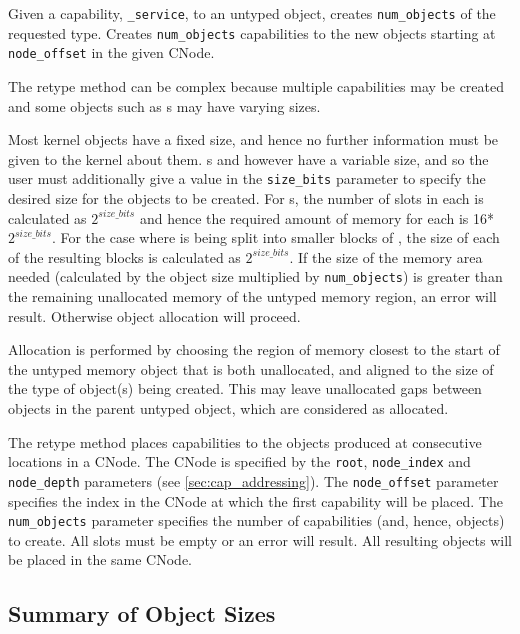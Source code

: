 {
Given a capability, \texttt{\_service}, to an untyped object,  
creates \texttt{num\_objects} of the requested type. Creates 
\texttt{num\_objects} capabilities to the new objects starting 
at \texttt{node\_offset} in the given CNode.

The retype method can be
complex because multiple capabilities may be created and some objects such as
s may have varying sizes.

Most kernel objects have a fixed size, and hence no further information
must be given to the kernel about them. s and  however have a variable size, and so the user must additionally
give a value in the \texttt{size\_bits} parameter to specify the desired
size for the objects to be created.
For s, the number of slots in each  is calculated as
$2^{size\_bits}$ and hence the required amount of memory for each is
16*$2^{size\_bits}$. For the case where  is being split into
smaller blocks of ,
the size of each of the resulting  blocks is 
calculated as $2^{size\_bits}$. If the size of the memory area needed (calculated
by the object size multiplied by \texttt{num\_objects}) is greater than the
remaining unallocated memory of the untyped memory region, an error will result.
Otherwise object allocation will proceed.

Allocation is performed by choosing the region of memory closest to
the start of the untyped memory object that is both unallocated, and aligned to the size of
the type of object(s) being created. This may leave unallocated gaps between objects in 
the parent untyped object, which are considered as allocated.

The retype method places capabilities to the objects produced at consecutive
locations in a CNode. The CNode is specified by the \texttt{root}, 
\texttt{node\_index}
and \texttt{node\_depth} parameters (see \autoref{sec:cap_addressing}). 
The \texttt{node\_offset} parameter  specifies the
index in the CNode at which the first capability will be placed. 
The \texttt{num\_objects}
parameter specifies the number of capabilities (and, hence, objects) 
to create. All slots
must be empty or an error will result. All resulting objects will be
placed in the same CNode. 


\subsection{Summary of Object Sizes}
\label{sec:object_sizes}

}
